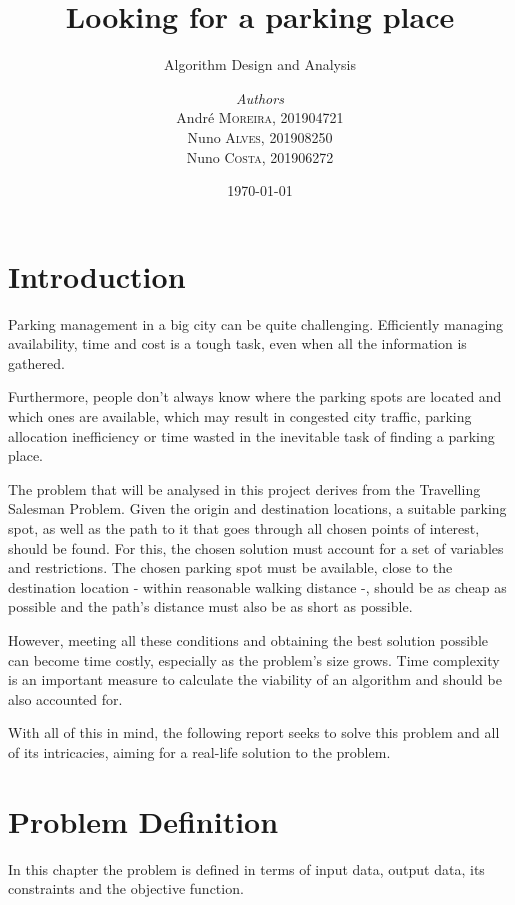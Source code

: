 \documentclass[a4paper, 12pt]{report}
\institute{Faculty Of Engineering, University Of Porto}
\subtitle{Algorithm Design and Analysis}
\title{Looking for a parking place}
\author{\textit{Authors}\\André \textsc{Moreira}, 201904721
        \\Nuno \textsc{Alves}, 201908250
        \\Nuno \textsc{Costa}, 201906272}
\date{\today}
\begin{document}
    \maketitle
    
    \romantableofcontents
    
    \chapter{Introduction} \label{intro}
    
    Parking management in a big city can be quite challenging. Efficiently managing availability, time and cost is a tough task, even when all the information is gathered.
    
    Furthermore, people don't always know where the parking spots are located and which ones are available, which may result in congested city traffic, parking allocation inefficiency or time wasted in the inevitable task of finding a parking place.
    
    The problem that will be analysed in this project derives from the Travelling Salesman Problem. Given the origin and destination locations, a suitable parking spot, as well as the path to it that goes through all chosen points of interest, should be found. For this, the chosen solution must account for a set of variables and restrictions. The chosen parking spot must be available, close to the destination location - within reasonable walking distance -, should be as cheap as possible and the path's distance must also be as short as possible.
    
    However, meeting all these conditions and obtaining the best solution possible can become time costly, especially as the problem's size grows. Time complexity is an important measure to calculate the viability of an algorithm and should be also accounted for.
    
    With all of this in mind, the following report seeks to solve this problem and all of its intricacies, aiming for a real-life solution to the problem.
    
    \newpage
    
    
    \chapter{Problem Definition} \label{pdef}
    
    In this chapter the problem is defined in terms of input data, output data, its constraints and the objective function. 
    
\end{document}
